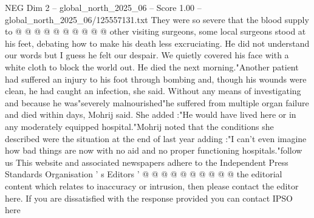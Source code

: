 \begin{textsample}{NEG Dim 2 – global\_north\_2025\_06 – Score 1.00 – global\_north\_2025\_06/125557131.txt}
They were so severe that the blood supply to @ @ @ @ @ @ @ @ @ @ other visiting surgeons, some local surgeons stood at his feet, debating how to make his death less excruciating.
He did not understand our words but I guess he felt our despair.
We quietly covered his face with a white cloth to block the world out.
He died the next morning."Another patient had suffered an injury to his foot through bombing and, though his wounds were clean, he had caught an infection, she said.
Without any means of investigating and because he was"severely malnourished"he suffered from multiple organ failure and died within days, Mohrij said.
She added :"He would have lived here or in any moderately equipped hospital."Mohrij noted that the conditions she described were the situation at the end of last year adding :"I can't even imagine how bad things are now with no aid and no proper functioning hospitals."follow us This website and associated newspapers adhere to the Independent Press Standards Organisation ' s Editors ' @ @ @ @ @ @ @ @ @ @ the editorial content which relates to inaccuracy or intrusion, then please contact the editor here.
If you are dissatisfied with the response provided you can contact IPSO here

\end{textsample}
